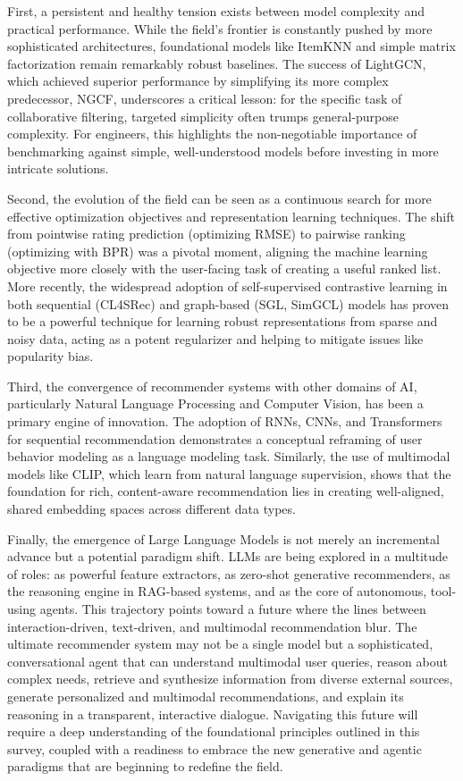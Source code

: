 \documentclass{article}
\begin{document}
    First, a persistent and healthy tension exists between model complexity and practical performance. While the field's frontier is constantly pushed by more sophisticated architectures, foundational models like ItemKNN and simple matrix factorization remain remarkably robust baselines. The success of LightGCN, which achieved superior performance by simplifying its more complex predecessor, NGCF, underscores a critical lesson: for the specific task of collaborative filtering, targeted simplicity often trumps general-purpose complexity. For engineers, this highlights the non-negotiable importance of benchmarking against simple, well-understood models before investing in more intricate solutions.

    Second, the evolution of the field can be seen as a continuous search for more effective optimization objectives and representation learning techniques. The shift from pointwise rating prediction (optimizing RMSE) to pairwise ranking (optimizing with BPR) was a pivotal moment, aligning the machine learning objective more closely with the user-facing task of creating a useful ranked list. More recently, the widespread adoption of self-supervised contrastive learning in both sequential (CL4SRec) and graph-based (SGL, SimGCL) models has proven to be a powerful technique for learning robust representations from sparse and noisy data, acting as a potent regularizer and helping to mitigate issues like popularity bias.

    Third, the convergence of recommender systems with other domains of AI, particularly Natural Language Processing and Computer Vision, has been a primary engine of innovation. The adoption of RNNs, CNNs, and Transformers for sequential recommendation demonstrates a conceptual reframing of user behavior modeling as a language modeling task. Similarly, the use of multimodal models like CLIP, which learn from natural language supervision, shows that the foundation for rich, content-aware recommendation lies in creating well-aligned, shared embedding spaces across different data types.

    Finally, the emergence of Large Language Models is not merely an incremental advance but a potential paradigm shift. LLMs are being explored in a multitude of roles: as powerful feature extractors, as zero-shot generative recommenders, as the reasoning engine in RAG-based systems, and as the core of autonomous, tool-using agents. This trajectory points toward a future where the lines between interaction-driven, text-driven, and multimodal recommendation blur. The ultimate recommender system may not be a single model but a sophisticated, conversational agent that can understand multimodal user queries, reason about complex needs, retrieve and synthesize information from diverse external sources, generate personalized and multimodal recommendations, and explain its reasoning in a transparent, interactive dialogue. Navigating this future will require a deep understanding of the foundational principles outlined in this survey, coupled with a readiness to embrace the new generative and agentic paradigms that are beginning to redefine the field.
\end{document}
